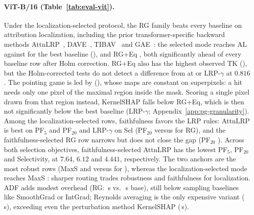 \documentclass[twoside]{article}
\newcommand{\1}{\mathbf{1}}
\begin{document}
\paragraph{ViT-B/16 (Table~\ref{tab:eval-vit}).}
Under the localization-selected protocol, the \ac{RG} family beats every baseline on attribution
localization, including the prior transformer-specific backward methods
AttnLRP~\citep{achtibat2024attnlrp}, DAVE~\citep{Wrobel2024},
\ac{TIBAV}~\citep{Chefer2021transformer} and \ac{GAE}~\citep{Chefer2021genatt}: the selected mode
reaches AL \vitRGlocAL{} against \vitBestBaseAL{} for the best baseline (\vitBestBaseALname), and
\ac{RG}+Eq \vitRGEqlocAL{}, both significantly ahead of every baseline row after Holm correction.
\ac{RG}+Eq also has the highest observed TK (\vitRGEqlocTK{}), but the Holm-corrected tests do not detect a difference from \vitBestBaseTKname{}
at \vitBestBaseTK{} or LRP-$\gamma$ at $0.816$. The pointing game is led by \vitBestBasePGname{} (\vitBestBasePG{}), whose
maps are constant on superpixels: a hit needs only one pixel of the maximal region inside the mask.
Scoring a single pixel drawn from that region instead, KernelSHAP falls below \ac{RG}+Eq, which is
then not significantly below the best baseline (LRP-$\gamma$; Appendix~\ref{app:pg-granularity}).
Among the localization-selected rows, faithfulness favors the \ac{LRP} rules: AttnLRP is best on PF$_5$ and PF$_{20}$ and LRP-$\gamma$ on
Sel (PF$_{20}$ \vitBestBasePFtwenty{} versus \vitRGlocPFtwenty{} for \ac{RG}), and the
faithfulness-selected \ac{RG} row narrows but does not close the gap (PF$_{20}$
\vitRGfaithPFtwenty{}). Across both selection objectives, faithfulness-selected AttnLRP has the lowest PF$_5$, PF$_{20}$ and Selectivity, at $7.64$, $6.12$ and $4.441$, respectively. The two anchors are the most robust rows (MaxS \vitRGanchorMaxS{} and
\vitRGEqanchorMaxS{} versus \vitBestBaseMaxS{} for \vitBestBaseMaxSname{}), whereas the
localization-selected mode reaches MaxS \vitRGlocMaxS{}: sharper routing trades robustness and
faithfulness for localization. \ac{ADF} adds modest overhead (\ac{RG}: \vitRGlocTime\,s vs.\
\vitRGanchorTime\,s base), still below sampling baselines like SmoothGrad or IntGrad; Reynolds
averaging is the only expensive variant (\vitRGEqTime\,s), exceeding even the perturbation method
KernelSHAP (\vitSHAPTime\,s).
\end{document}
